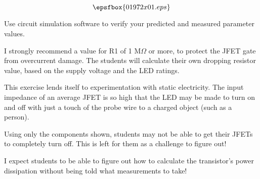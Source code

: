 

$$\epsfbox{01972x01.eps}$$

\vfil \eject






Use circuit simulation software to verify your predicted and measured parameter values.







I strongly recommend a value for R1 of 1 M$\Omega$ or more, to protect the JFET gate from overcurrent damage.  The students will calculate their own dropping resistor value, based on the supply voltage and the LED ratings.

This exercise lends itself to experimentation with static electricity.  The input impedance of an average JFET is so high that the LED may be made to turn on and off with just a touch of the probe wire to a charged object (such as a person).

Using only the components shown, students may not be able to get their JFETs to completely turn off.  This is left for them as a challenge to figure out!

I expect students to be able to figure out how to calculate the transistor's power dissipation without being told what measurements to take!




